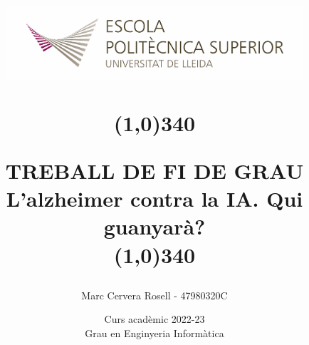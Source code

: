 \title{
	\begin{center}
	\vspace{3cm}
	\includegraphics[width=11cm, height=3cm]{images/Logo-nou-eps.jpg}
	\end{center}
	\begin{center}
	\line(1,0){340}
	\end{center}		
	TREBALL DE FI DE GRAU\\
	\vspace{2mm}
	\Large L'alzheimer contra la IA. Qui guanyarà?\\
	\line(1,0){340}
	\vspace{2.5cm}
	}

\author{Marc Cervera Rosell - 47980320C \vspace{1cm}}


\date{Curs acadèmic 2022-23\vspace{0.5cm} \\Grau en Enginyeria Informàtica}